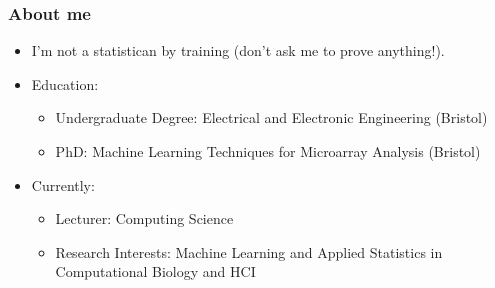 \begin{frame}
	\frametitle{About me}
	\begin{itemize}
		\item I'm not a statistican by training (don't ask me to prove anything!).
		\item Education:
		\begin{itemize}
			\item Undergraduate Degree: Electrical and Electronic Engineering (Bristol)
			\item PhD: Machine Learning Techniques for Microarray Analysis (Bristol)
		\end{itemize}
		\item Currently:
		\begin{itemize}
			\item Lecturer: Computing Science
			\item Research Interests: Machine Learning and Applied Statistics in Computational Biology and \ac{HCI}
		\end{itemize}
	\end{itemize}
	
\end{frame}